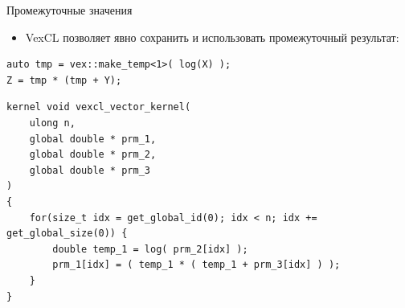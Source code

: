\documentclass[@BEAMER_OPTIONS@]{beamer}
\begin{document}
\note{ }

\begin{frame}[fragile]{Промежуточные значения}
    \begin{itemize}
        \item VexCL позволяет явно сохранить и использовать промежуточный
            результат:
    \end{itemize}
    \begin{exampleblock}{}
        \begin{lstlisting}
auto tmp = vex::make_temp<1>( log(X) );
Z = tmp * (tmp + Y);
        \end{lstlisting}
    \end{exampleblock}
    \begin{exampleblock}{}
        \begin{lstlisting}
kernel void vexcl_vector_kernel(
    ulong n,
    global double * prm_1,
    global double * prm_2,
    global double * prm_3
)
{
    for(size_t idx = get_global_id(0); idx < n; idx += get_global_size(0)) {
        double temp_1 = log( prm_2[idx] );
        prm_1[idx] = ( temp_1 * ( temp_1 + prm_3[idx] ) );
    }
}
        \end{lstlisting}
    \end{exampleblock}
\end{frame}

\note{ }
\end{document}
